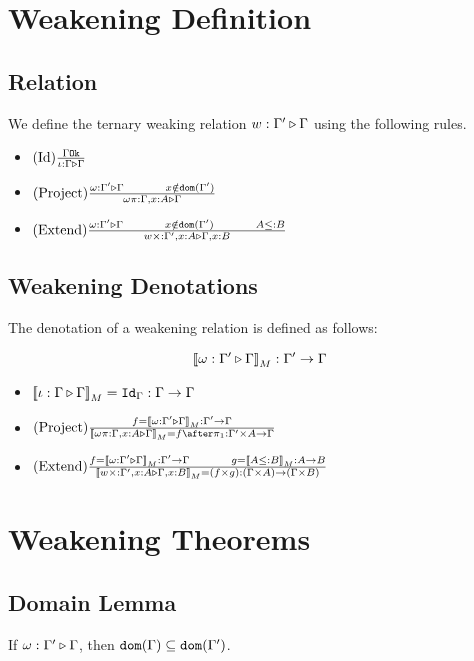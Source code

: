\documentclass{report}
\begin{document}
\section{Weakening Definition}
\subsection{Relation}
We define the ternary weaking relation $w : \Gamma' \triangleright \Gamma$ using the following rules.


\begin{itemize}
    \item $(\text{Id}) \frac{\Gamma \texttt{Ok}}{\iota : \Gamma \triangleright \Gamma}$
    \item $\treerule{Project}{\wrel{\w}{\G'}{\G}\s\s x \notin \dom{\G'}}{\wrel{\w \pi}{\G, x: A}{\G}}$
    \item $\treerule{Extend}{\wrel{\w}{\G'}{\G}\s\s x \notin \dom{\G'}\s\s A \subtype B}{\wrel{w \x}{\G', x: A}{\G, x: B}}$
\end{itemize}

\subsection{Weakening Denotations}
The denotation of a weakening relation is defined as follows:

\begin{equation}
    {\bf [\![}\omega : \Gamma' \triangleright \Gamma{\bf ]\!]}_M: \Gamma' \rightarrow \Gamma
\end{equation}

\begin{itemize}
    \item ${\bf [\![}\iota : \Gamma \triangleright \Gamma{\bf ]\!]}_M = \texttt{Id}_{\Gamma}: \Gamma \rightarrow \Gamma$
    \item $\treerule{Project}{f = \deno{\wrel{\w}{\G'}{\G}}: \G' \rightarrow \G}{\deno{\wrel{\w \pi}{\G, x: A}{\G}} = f\after \p: \G'\times A \rightarrow \G}$
    \item $\treerule{Extend}{f = \deno{\wrel{\w}{\G'}{\G}}: \G' \rightarrow \G \s\s g = \deno{A \subtype B}: A \rightarrow B}{\deno{\wrel{w \x}{\G', x: A}{\G, x: B}} = (f\times g): (\G\times A)\rightarrow(\G\times B)}$
\end{itemize}

\section{Weakening Theorems}
\subsection{Domain Lemma}
If $\omega : \Gamma' \triangleright \Gamma$, then $\texttt{dom}(\Gamma)\subseteq \texttt{dom}(\Gamma')$.
\end{document}
